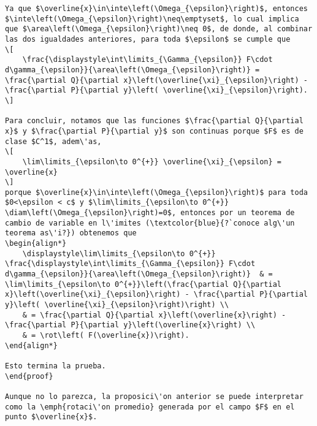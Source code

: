 \documentclass[
]{krantz}
\theoremstyle{definition}
\renewcommand{\epsilon}{\varepsilon}  %
\renewcommand{\emptyset}{\varnothing}  %
\DeclareMathOperator{\inte}{int}
\DeclareMathOperator{\rot}{Rot}
\DeclareMathOperator{\diam}{di\acute{a}m}
\DeclareMathOperator{\area}{\acute{a}rea}
\theoremstyle{definition}
\theoremstyle{definition}
\theoremstyle{definition}
\theoremstyle{remark}
\begin{document}
\begin{verbatim}
Ya que $\overline{x}\in\inte\left(\Omega_{\epsilon}\right)$, entonces $\inte\left(\Omega_{\epsilon}\right)\neq\emptyset$, lo cual implica que $\area\left(\Omega_{\epsilon}\right)\neq 0$, de donde, al combinar las dos igualdades anteriores, para toda $\epsilon$ se cumple que
\[
    \frac{\displaystyle\int\limits_{\Gamma_{\epsilon}} F\cdot d\gamma_{\epsilon}}{\area\left(\Omega_{\epsilon}\right)} = \frac{\partial Q}{\partial x}\left(\overline{\xi}_{\epsilon}\right) - \frac{\partial P}{\partial y}\left( \overline{\xi}_{\epsilon}\right).
\]

Para concluir, notamos que las funciones $\frac{\partial Q}{\partial x}$ y $\frac{\partial P}{\partial y}$ son continuas porque $F$ es de clase $C^1$, adem\'as,
\[
    \lim\limits_{\epsilon\to 0^{+}} \overline{\xi}_{\epsilon} = \overline{x}
\]
porque $\overline{x}\in\inte\left(\Omega_{\epsilon}\right)$ para toda $0<\epsilon < c$ y $\lim\limits_{\epsilon\to 0^{+}} \diam\left(\Omega_{\epsilon}\right)=0$, entonces por un teorema de cambio de variable en l\'imites (\textcolor{blue}{?`conoce alg\'un teorema as\'i?}) obtenemos que
\begin{align*}
    \displaystyle\lim\limits_{\epsilon\to 0^{+}} \frac{\displaystyle\int\limits_{\Gamma_{\epsilon}} F\cdot d\gamma_{\epsilon}}{\area\left(\Omega_{\epsilon}\right)}  & = \lim\limits_{\epsilon\to 0^{+}}\left(\frac{\partial Q}{\partial x}\left(\overline{\xi}_{\epsilon}\right) - \frac{\partial P}{\partial y}\left( \overline{\xi}_{\epsilon}\right)\right) \\
    & = \frac{\partial Q}{\partial x}\left(\overline{x}\right) - \frac{\partial P}{\partial y}\left(\overline{x}\right) \\
    & = \rot\left( F(\overline{x})\right).
\end{align*}

Esto termina la prueba.
\end{proof}

Aunque no lo parezca, la proposici\'on anterior se puede interpretar como la \emph{rotaci\'on promedio} generada por el campo $F$ en el punto $\overline{x}$.


\end{verbatim}
\end{document}
